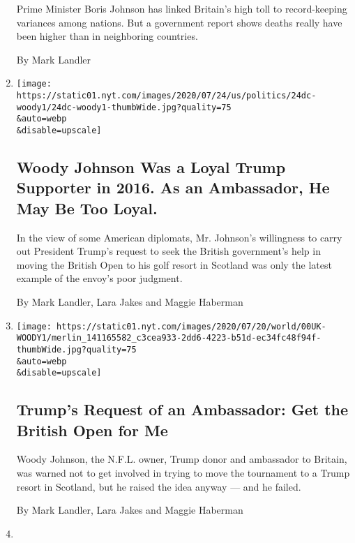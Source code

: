 \begin{enumerate}
  Prime Minister Boris Johnson has linked Britain's high toll to
  record-keeping variances among nations. But a government report shows
  deaths really have been higher than in neighboring countries.

  By Mark Landler
\item
  \href{/2020/07/24/world/europe/woody-johnson-trump.html}{}

  \texttt{[image: https://static01.nyt.com/images/2020/07/24/us/politics/24dc-woody1/24dc-woody1-thumbWide.jpg?quality=75\\\&auto=webp\\\&disable=upscale]}

  \hypertarget{woody-johnson-was-a-loyal-trump-supporter-in-2016-as-an-ambassador-he-may-be-too-loyal}{%
  \subsection{Woody Johnson Was a Loyal Trump Supporter in 2016. As an
  Ambassador, He May Be Too
  Loyal.}\label{woody-johnson-was-a-loyal-trump-supporter-in-2016-as-an-ambassador-he-may-be-too-loyal}}

  In the view of some American diplomats, Mr. Johnson's willingness to
  carry out President Trump's request to seek the British government's
  help in moving the British Open to his golf resort in Scotland was
  only the latest example of the envoy's poor judgment.

  By Mark Landler, Lara Jakes and Maggie Haberman
\item
  \href{/2020/07/21/world/europe/trump-british-open.html}{}

  \texttt{[image: https://static01.nyt.com/images/2020/07/20/world/00UK-WOODY1/merlin\_141165582\_c3cea933-2dd6-4223-b51d-ec34fc48f94f-thumbWide.jpg?quality=75\\\&auto=webp\\\&disable=upscale]}

  \hypertarget{trumps-request-of-an-ambassador-get-the-british-open-for-me}{%
  \subsection{Trump's Request of an Ambassador: Get the British Open for
  Me}\label{trumps-request-of-an-ambassador-get-the-british-open-for-me}}

  Woody Johnson, the N.F.L. owner, Trump donor and ambassador to
  Britain, was warned not to get involved in trying to move the
  tournament to a Trump resort in Scotland, but he raised the idea
  anyway --- and he failed.

  By Mark Landler, Lara Jakes and Maggie Haberman
\item
  \href{/2020/07/21/world/europe/uk-russia-report-brexit-interference.html}{}


\end{enumerate}
